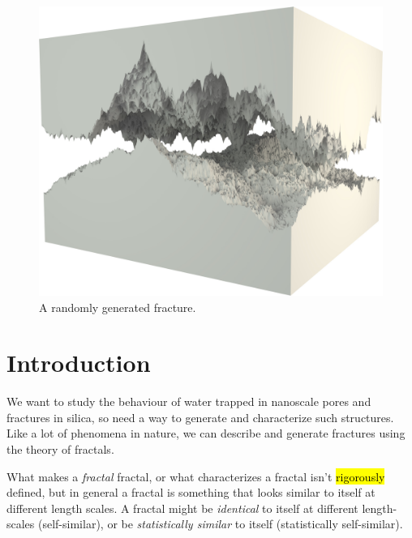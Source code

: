 \vspace*{\fill}
\begin{figure}[hp!]%
\thispagestyle{empty}
    \centering%
    \includegraphics[width=\textwidth]{images/fracture/large_fracture05.jpg}%
    \caption{%
        A randomly generated fracture.%
    }%
\end{figure}%
\vspace{\fill}

\chapter{Introduction}
We want to study the behaviour of water trapped in nanoscale pores and fractures in silica, so need a way to generate and characterize such structures. Like a lot of phenomena in nature, we can describe and generate fractures using the theory of fractals\cite{mandelbrot1983fractal}.

What makes a \emph{fractal} fractal, or what characterizes a fractal isn't \hl{rigorously} defined, but in general a fractal is something that looks similar to itself at different length scales. A fractal might be \emph{identical} to itself at different length-scales (self-similar), or be \emph{statistically similar} to itself (statistically self-similar).

